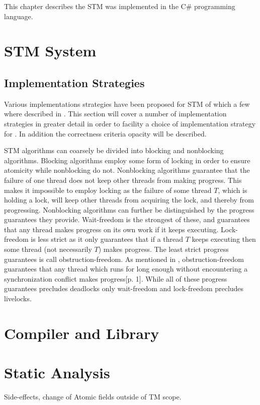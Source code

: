\makeatletter {}\makeatother
{}
This chapter describes the \ac{STM} was implemented in the C\# programming language.
\label{chap:implementation}
\section{\ac{STM} System}
\subsection{Implementation Strategies}
Various implementations strategies have been proposed for \ac{STM} of which a few where described in . This section will cover a number of implementation strategies in greater detail in order to facility a choice of implementation strategy for \stmname. In addition the correctness criteria opacity will be described.

\ac{STM} algorithms can coarsely be divided into blocking and nonblocking algorithms\cite[p. 47]{harris2010transactional}. Blocking algorithms employ some form of locking in order to ensure atomicity while nonblocking do not\cite[p. 59]{herlihy2012art}. Nonblocking algorithms guarantee that the failure of one thread does not keep other threads from making progress\cite[p. 47]{harris2010transactional}\cite[p. 142]{herlihy1991wait}\cite[p. 59]{herlihy2012art}. This  makes it impossible to employ locking as the failure of some thread $T$, which is holding a lock, will keep other threads from acquiring the lock, and thereby from progressing. Nonblocking algorithms can further be distinguished by the progress guarantees they provide. Wait-freedom is the strongest of these, and guarantees that any thread makes progress on its own work if it keeps executing\cite[p. 124]{herlihy1991wait}\cite[p. 59]{herlihy2012art}. Lock-freedom is less strict as it only guarantees that if a thread $T$ keeps executing then some thread (not necessarily $T$) makes progress\cite[p. 47]{harris2010transactional}\cite[p. 60]{herlihy2012art}. The least strict progress guarantees is call obstruction-freedom\cite[p. 47]{harris2010transactional}\cite{herlihy2003obstruction}\cite[p. 61]{herlihy2012art}. As mentioned in , obstruction-freedom guarantees that any thread which runs for long enough without encountering a synchronization conflict makes progress\cite{herlihy2003obstruction}[p. 1]. While all of these progress guarantees precludes deadlocks only wait-freedom and lock-freedom precludes livelocks\cite[p. 47]{harris2010transactional}.

\section{Compiler and Library}
\section{Static Analysis}
Side-effects, change of Atomic fields outside of TM scope.

\worksheetend